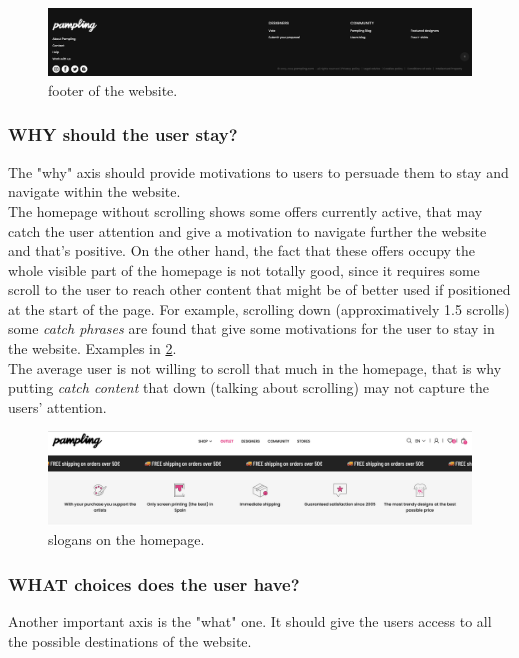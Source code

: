 \begin{figure}[h!]
	\centering
	\includegraphics[scale=0.225]{images/footer.png}
	\caption{footer of the website.}
	\label{fig:footer}
\end{figure}


\subsubsection{WHY should the user stay?} 
The "why" axis should provide motivations to users to persuade them to stay and navigate within the website.\\

The homepage without scrolling shows some offers currently active, that may catch the user attention and give a motivation to navigate further the website and that's positive.
On the other hand, the fact that these offers occupy the whole visible part of the homepage is not totally good, since it requires some scroll to the user to reach other content
that might be of better used if positioned at the start of the page.
For example, scrolling down (approximatively 1.5 scrolls) some \textit{catch phrases} are found that give some motivations for the user to stay in the website.
Examples in \cref{fig:slogan}.\\
The average user is not willing to scroll that much in the homepage, that is why putting \textit{catch content} that down (talking about scrolling) may not capture the users' attention.

\begin{figure}[h!]
	\centering
	\includegraphics[scale=0.225]{images/slogan.png}
	\caption{slogans on the homepage.}
	\label{fig:slogan}
\end{figure}

\subsubsection{WHAT choices does the user have?} 
Another important axis is the "what" one. It should give the users access to all the possible destinations of the website.\\


